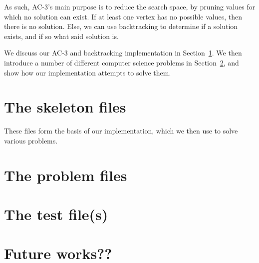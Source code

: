 \documentclass[12pt,a4paper]{article}
\begin{document}
As such, AC-3's main purpose is to reduce the search space, by pruning values for which no
 solution can exist. If at least one vertex has no possible values, then there is no solution.
Else, we can use backtracking to determine if a solution exists, and if so what said solution is.

We discuss our AC-3 and backtracking implementation in Section~\ref{sec:skeleton}. 
We then introduce a number of different computer science problems in Section~\ref{sec:problems}, and show how our implementation
attempts to solve them. 

\section{The skeleton files}\label{sec:skeleton}
These files form the basis of our implementation, which we then use to solve various problems.





\section{The problem files}\label{sec:problems} %












\section{The test file(s)}




\section{Future works??}



\end{document}
